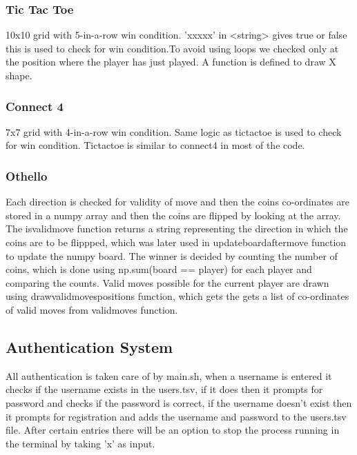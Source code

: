 \documentclass[12pt]{article}
\begin{document}
\subsubsection{Tic Tac Toe}
\label{sec:t3}

10x10 grid with 5-in-a-row win condition.
'xxxxx' in <string> gives true or false this is used to check for win condition.To avoid using loops we checked only at the position where the player has just played.
A function is defined to draw X shape.

\subsubsection{Connect 4}
\label{sec:c4}

7x7 grid with 4-in-a-row win condition.
Same logic as tictactoe is used to check for win condition.
Tictactoe is similar to connect4 in most of the code.

\subsubsection{Othello}
\label{sec:o2}

Each direction is checked for validity of move and then the coins co-ordinates are stored in a numpy array and then the coins are flipped by looking at the array. The isvalidmove function returns a string representing the direction in which the coins are to be flippped, which was later used in updateboardaftermove function to update the numpy board.
The winner is decided by counting the number of coins, which is done using np.sum(board == player) for each player and comparing the counts.
Valid moves possible for the current player are drawn using drawvalidmovespositions function, which gets the gets a list of co-ordinates of valid moves from validmoves function.

\subsection{Authentication System}
\label{sec:auth}

All authentication is taken care of by main.sh, when a username is entered it checks if the username exists in the users.tsv, if it does then it prompts for password and checks if the password is correct, if the username doesn't exist then it prompts for registration and adds the username and password to the users.tsv file.
After certain entries there will be an option to stop the process running in the terminal by taking 'x' as input.
\end{document}
